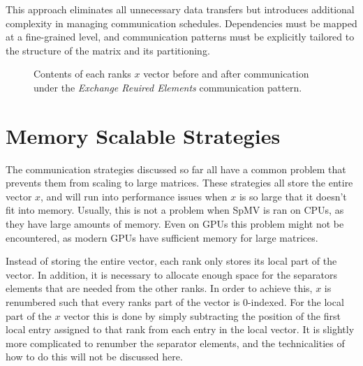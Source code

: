 This approach eliminates all unnecessary data transfers but introduces additional complexity in managing communication schedules. Dependencies must be mapped at a fine-grained level, and communication patterns must be explicitly tailored to the structure of the matrix and its partitioning.



\begin{figure}[ht]
    \centering
    \caption{Contents of each ranks \(x\) vector before and after communication under the \textit{Exchange Reuired Elements} communication pattern.}
    \label{fig:1dcomm}
\end{figure}


\section{Memory Scalable Strategies}
The communication strategies discussed so far all have a common problem that prevents them from scaling to large matrices. These strategies all store the entire vector \(x\), and will run into performance issues when \(x\) is so large that it doesn't fit into memory. Usually, this is not a problem when SpMV is ran on CPUs, as they have large amounts of memory. Even on GPUs this problem might not be encountered, as modern GPUs have sufficient memory for large matrices.
\medskip

Instead of storing the entire vector, each rank only stores its local part of the vector. In addition, it is necessary to allocate enough space for the separators elements that are needed from the other ranks. In order to achieve this, \(x\) is renumbered such that every ranks part of the vector is 0-indexed. For the local part of the \(x\) vector this is done by simply subtracting the position of the first local entry assigned to that rank from each entry in the local vector. It is slightly more complicated to renumber the separator elements, and the technicalities of how to do this will not be discussed here.
\medskip

